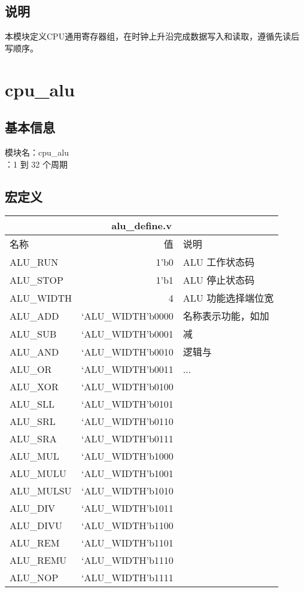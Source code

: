\subsection{说明}
本模块定义CPU通用寄存器组，在时钟上升沿完成数据写入和读取，遵循先读后写顺序。

\section{cpu\_alu}
\subsection{基本信息}
模块名：cpu\_alu\\
：1 到 32 个周期
\subsection{宏定义}
\begin{tabular}{|l|r|l|}
    \hline
    \multicolumn{3}{|c|}{alu\_define.v}\\\hline
    名称    &   值  &   说明\\\hline
    ALU\_RUN     &      1'b0   &  ALU 工作状态码\\ \hline
    ALU\_STOP    &      1'b1   &  ALU 停止状态码\\ \hline
    ALU\_WIDTH   &      4      &  ALU 功能选择端位宽\\ \hline
    ALU\_ADD     &   `ALU\_WIDTH'b0000 &  名称表示功能，如加\\ \hline
    ALU\_SUB     &   `ALU\_WIDTH'b0001 &  减\\ \hline
    ALU\_AND     &   `ALU\_WIDTH'b0010 &  逻辑与\\ \hline
    ALU\_OR      &   `ALU\_WIDTH'b0011 &  ...\\ \hline
    ALU\_XOR     &   `ALU\_WIDTH'b0100 &  \\ \hline
    ALU\_SLL     &   `ALU\_WIDTH'b0101 &  \\ \hline
    ALU\_SRL     &   `ALU\_WIDTH'b0110 &  \\ \hline
    ALU\_SRA     &   `ALU\_WIDTH'b0111 &  \\ \hline
    ALU\_MUL     &   `ALU\_WIDTH'b1000 &  \\ \hline
    ALU\_MULU    &   `ALU\_WIDTH'b1001 &  \\ \hline
    ALU\_MULSU   &   `ALU\_WIDTH'b1010 &  \\ \hline
    ALU\_DIV     &   `ALU\_WIDTH'b1011 &  \\ \hline
    ALU\_DIVU    &   `ALU\_WIDTH'b1100 &  \\ \hline
    ALU\_REM     &   `ALU\_WIDTH'b1101 &  \\ \hline
    ALU\_REMU    &   `ALU\_WIDTH'b1110 &  \\ \hline
    ALU\_NOP     &   `ALU\_WIDTH'b1111 &  \\ \hline
\end{tabular}
